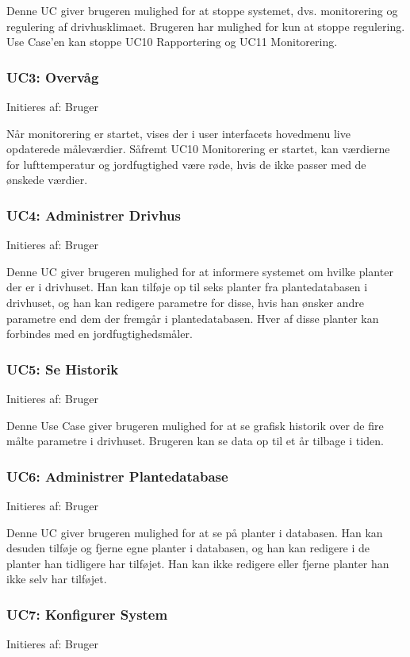 Denne UC giver brugeren mulighed for at stoppe systemet, dvs. monitorering og regulering af drivhusklimaet. 
Brugeren har mulighed for kun at stoppe regulering. Use Case’en kan stoppe UC10 Rapportering og UC11 Monitorering.

\subsubsection{UC3: Overvåg}
Initieres af: Bruger

Når monitorering er startet, vises der i user interfacets hovedmenu live opdaterede måleværdier. 
Såfremt UC10 Monitorering er startet, kan værdierne for lufttemperatur og jordfugtighed være røde, hvis de ikke passer med de ønskede værdier.

\subsubsection{UC4: Administrer Drivhus}
Initieres af: Bruger

Denne UC giver brugeren mulighed for at informere systemet om hvilke planter der er i drivhuset. 
Han kan tilføje op til seks planter fra plantedatabasen i drivhuset, og han kan redigere parametre for disse, hvis han ønsker andre parametre end dem der fremgår i plantedatabasen. 
Hver af disse planter kan forbindes med en jordfugtighedsmåler. 

\subsubsection{UC5: Se Historik}
Initieres af: Bruger

Denne Use Case giver brugeren mulighed for at se grafisk historik over de fire målte parametre i drivhuset. 
Brugeren kan se data op til et år tilbage i tiden. 

\subsubsection{UC6: Administrer Plantedatabase}
Initieres af: Bruger

Denne UC giver brugeren mulighed for at se på planter i databasen. 
Han kan desuden tilføje og fjerne egne planter i databasen, og han kan redigere i de planter han tidligere har tilføjet. 
Han kan ikke redigere eller fjerne planter han ikke selv har tilføjet. 

\subsubsection{UC7: Konfigurer System}
Initieres af: Bruger

